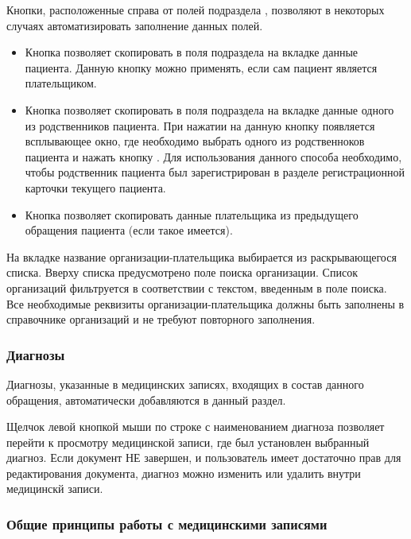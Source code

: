 {{Кнопки, расположенные справа от полей подраздела , позволяют в некоторых случаях автоматизировать заполнение данных полей. 
\begin{itemize}
	\item Кнопка  позволяет скопировать в поля подраздела  на вкладке  данные пациента. Данную кнопку можно применять, если сам пациент является плательщиком.
	\item Кнопка  позволяет скопировать в поля подраздела  на вкладке  данные одного из родственников пациента. При нажатии на данную кнопку появляется всплывающее окно, где необходимо выбрать одного из родственноков пациента и нажать кнопку . Для использования данного способа необходимо, чтобы родственник пациента был зарегистрирован в разделе  регистрационной карточки текущего пациента.
	\item Кнопка  позволяет скопировать данные плательщика из предыдущего обращения пациента (если такое имеется).
\end{itemize} 

На вкладке  название организации-плательщика выбирается из раскрывающегося списка. Вверху списка предусмотрено поле поиска организации. Список организаций фильтруется в соответствии с текстом, введенным в поле поиска. Все необходимые реквизиты организации-плательщика должны быть заполнены в справочнике организаций и не требуют повторного заполнения.
}{}

\subsubsection{Диагнозы}

Диагнозы, указанные в медицинских записях, входящих в состав данного обращения, автоматически добавляются в данный раздел.

Щелчок левой кнопкой мыши по строке с наименованием диагноза позволяет перейти к просмотру медицинской записи, где был установлен выбранный диагноз. Если документ НЕ завершен, и пользователь имеет достаточно прав для редактирования документа, диагноз можно изменить или удалить внутри медицинскй записи.

\subsubsection{Общие принципы работы с медицинскими записями} \label{pol_obr_gen}

}
